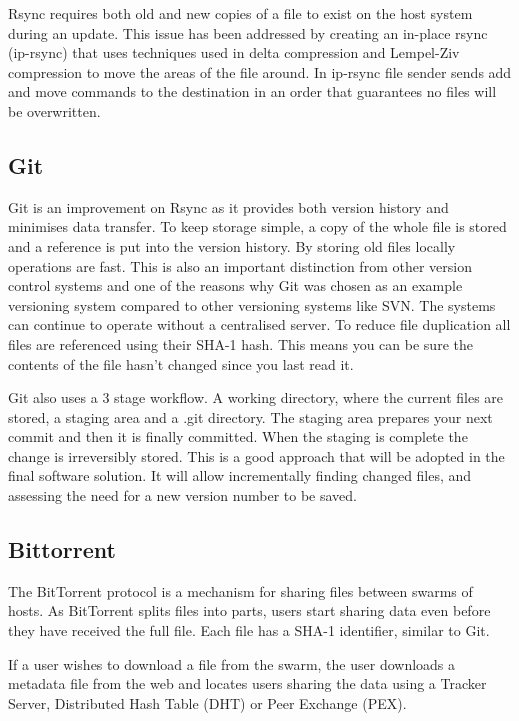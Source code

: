 \documentclass[a4paper,11pt, twocolumn]{report}
\begin{document}
Rsync requires both old and new copies of a file to exist on the host system during an update. This issue has been addressed by creating an in-place rsync (ip-rsync) that uses techniques used in delta compression and Lempel-Ziv compression to move the areas of the file around. In ip-rsync file sender sends add and move commands to the destination in an order that guarantees no files will be overwritten. \citep{rasch2003place}


\subsection{Git}
Git is an improvement on Rsync as it provides both version history and minimises data transfer. To keep storage simple, a copy of the whole file is stored and a reference is put into the version history. By storing old files locally operations are fast. This is also an important distinction from other version control systems and one of the reasons why Git was chosen as an example versioning system compared to other versioning systems like SVN. The systems can continue to operate without a centralised server. To reduce file duplication all files are referenced using their SHA-1 hash. This means you can be sure the contents of the file hasn’t changed since you last read it. \citep{torvalds2010git}

Git also uses a 3 stage workflow. A working directory, where the current files are stored, a staging area and a .git directory. The staging area prepares your next commit and then it is finally committed. When the staging is complete the change is irreversibly stored. This is a good approach that will be adopted in the final software solution. It will allow incrementally finding changed files, and assessing the need for a new version number to be saved.


\subsection{Bittorrent}
The BitTorrent protocol is a mechanism for sharing files between swarms of hosts. As BitTorrent splits files into parts, users start sharing data even before they have received the full file. Each file has a SHA-1 identifier, similar to Git. \citep{qiu2004modeling}

If a user wishes to download a file from the swarm, the user downloads a metadata file from the web and locates users sharing the data using a Tracker Server, Distributed Hash Table (DHT) or Peer Exchange (PEX). \citep{cohen2008bittorrent}
\end{document}
